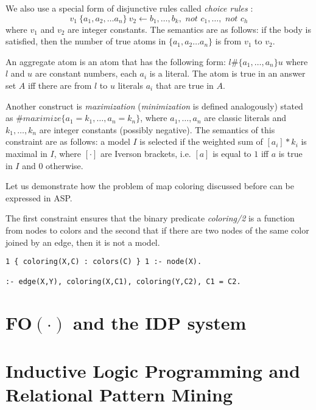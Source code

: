 We also use a special form of disjunctive rules called \textit{choice rules} \parencite{aspbook}:
\begin{equation*}
  v_1~\{ a_1, a_2, \dots a_n \}~v_2 \leftarrow b_1, \dots, b_k, \textit{ not }c_1,\dots,\textit{ not }c_h
\end{equation*}
where $v_1$ and $v_2$ are integer constants. The semantics are as follows: if the body is satisfied, then the number of true atoms in $\{ a_1, a_2 \dots a_n \}$ is from $v_1$ to $v_2$.

An aggregate atom is an atom that has the following form: $l \# \{ a_1, \dots ,a_n \} u$
where $l$ and $u$ are constant numbers, each $a_i$ is a literal. The atom is true in an answer set $A$ iff there are from $l$ to $u$ literals $a_i$ that are true in $A$.

Another construct is \textit{maximization} \parencite{aspbook, leone} (\textit{minimization} is defined analogously) stated as $\#\textit{maximize}\{ a_1=k_1, \dots, a_n=k_n \}$, 
where $a_1, \dots, a_n$ are classic literals and $k_1, \dots, k_n$ are integer constants (possibly negative). The semantics of this constraint are as follows: a model $I$ is selected if the weighted sum of $[a_i]*k_i$ is maximal in $I$, where $[\cdot]$ are Iverson brackets, i.e. $[a]$ is equal to $1$ iff $a$ is true in $I$ and $0$ otherwise.

\begin{example}
  Let us demonstrate how the problem of map coloring discussed before can be expressed in ASP. 

  The first constraint ensures that the binary predicate \textit{coloring/2} is a function from nodes to colors and the second that if there are two nodes of the same color joined by an edge, then it is not a model.
\begin{lstlisting}[caption=ASP encoding of map coloring constraints, label=lst:example_asp_coloring,basicstyle=\ttfamily]
1 { coloring(X,C) : colors(C) } 1 :- node(X).

:- edge(X,Y), coloring(X,C1), coloring(Y,C2), C1 = C2.
\end{lstlisting}
\end{example}


\section{FO$(\cdot)$ and the IDP system}

\section{Inductive Logic Programming and Relational Pattern Mining}
